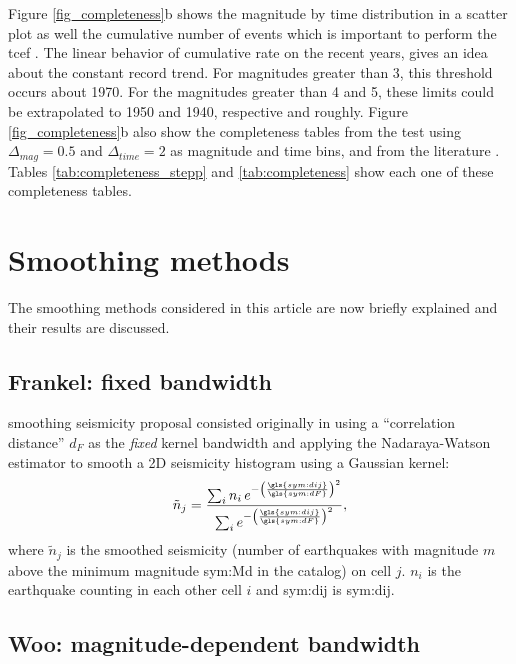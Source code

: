 \documentclass[draft, grl]{agutex}
\begin{document}
\begin{article}
Figure \ref{fig_completeness}b shows the magnitude by time distribution in a scatter plot as well the cumulative number of events which is important to perform the \gls{tcef} \citep{nasir_2013}. The linear behavior of cumulative rate on the recent years, gives an idea about the constant record trend. For magnitudes greater than 3, this threshold occurs about 1970. For the magnitudes greater than 4 and 5, these limits could be extrapolated to 1950 and 1940, respective and roughly. Figure \ref{fig_completeness}b also show the completeness tables from the \citet{stepp_1972} test using $\Delta_{mag}=0.5$ and $\Delta_{time}=2$ as magnitude and time bins, and from the literature \citep{assumpcao_et_al_2014}. Tables \ref{tab:completeness_stepp} and \ref{tab:completeness} show each one of these completeness tables.


%
%
\section{Smoothing methods}
The smoothing methods considered in this article are now briefly explained and their results are discussed.

\subsection{Frankel: fixed bandwidth}

\citet{frankel_1995} smoothing seismicity proposal consisted originally in using a ``correlation distance'' $d_F$ as the \textit{fixed} kernel bandwidth and applying the Nadaraya-Watson \citep{nadaraya_1964, watson_1964} estimator to smooth a 2D seismicity histogram using a Gaussian kernel:
\begin{equation}
	\ensuremath{
		\tilde{n}_j = \frac{ \sum_{i} n_i \,e^{ - \left(\frac{\gls{sym:dij}}{\gls{sym:dF}}\right)^2}}
						   { \sum_{i}     e^{ - \left(\frac{\gls{sym:dij}}{\gls{sym:dF}}\right)^2}},
	}
	\label{eq:ni}
\end{equation}
where $\tilde{n}_j$ is the smoothed seismicity (number of earthquakes with magnitude $m$ above the minimum magnitude \gls{sym:Md} in the catalog) on cell $j$. $n_i$ is the earthquake counting in each other cell $i$ and \gls{sym:dij} is \glsdesc{sym:dij}.



\subsection{Woo: magnitude-dependent bandwidth}


\end{article}
\end{document}
